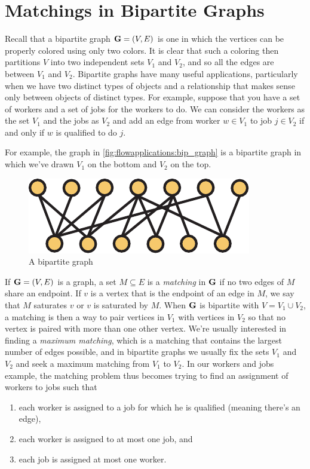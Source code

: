\section{Matchings in Bipartite Graphs}

Recall that a bipartite graph $\mathbf{G}=(V,E)$ is one in which the vertices can
be properly colored using only two colors. It is clear that such a
coloring then partitions $V$ into two independent sets $V_1$ and
$V_2$, and so all the edges are between $V_1$ and $V_2$. Bipartite
graphs have many useful applications, particularly when we have two
distinct types of objects and a relationship that makes sense only
between objects of distinct types. For example, suppose that you have
a set of workers and a set of jobs for the workers to do. We can
consider the workers as the set $V_1$ and the jobs as $V_2$ and add an
edge from worker $w\in V_1$ to job $j\in V_2$ if and only if $w$ is
qualified to do $j$. 

For example, the graph in \autoref{fig:flowapplications:bip_graph} is
a bipartite graph in which we've drawn $V_1$ on the bottom and $V_2$
on the top.

\begin{figure}[h]
  \centering
  \includegraphics[scale=0.65]{flowapplications-figs/bipartite_graph}
  \caption{A bipartite graph}
  \label{fig:flowapplications:bip_graph}
\end{figure}

If $\mathbf{G}=(V,E)$ is a graph, a set $M\subseteq E$ is a \emph{matching} in
$\mathbf{G}$ if no two edges of $M$ share an endpoint. If $v$ is a vertex
that is the endpoint of an edge in $M$, we say that $M$ saturates $v$
or $v$ is saturated by $M$. When $\mathbf{G}$ is bipartite with $V=V_1\cup
V_2$, a matching is then a way to pair vertices in $V_1$ with vertices
in $V_2$ so that no vertex is paired with more than one other
vertex. We're usually interested in finding a \emph{maximum matching},
which is a matching that contains the largest number of edges
possible, and in bipartite graphs we usually fix the sets $V_1$ and
$V_2$ and seek a maximum matching from $V_1$ to $V_2$. In our workers
and jobs example, the matching problem thus becomes trying to find an
assignment of workers to jobs such that
\begin{enumerate}[label=(\roman*)]
\item each worker is assigned to a job for which he is qualified
  (meaning there's an edge),
\item each worker is assigned to at most one job, and
\item each job is assigned at most one worker.
\end{enumerate}

